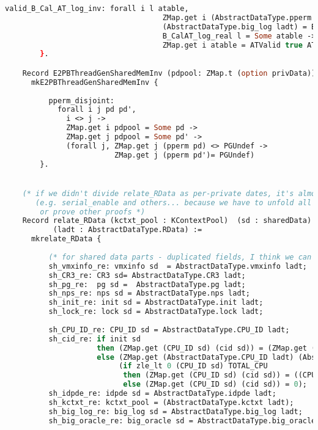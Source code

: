 \begin{lstlisting}[language=Caml]
          valid_B_Cal_AT_log_inv: forall i l atable, 
                                    ZMap.get i (AbstractDataType.pperm ladt) <> PGUndef ->
                                    (AbstractDataType.big_log ladt) = BigDef l ->
                                    B_CalAT_log_real l = Some atable ->
                                    ZMap.get i atable = ATValid true ATNorm
        }.

    Record E2PBThreadGenSharedMemInv (pdpool: ZMap.t (option privData)) :=
      mkE2PBThreadGenSharedMemInv {
          
          pperm_disjoint: 
            forall i j pd pd',
              i <> j ->
              ZMap.get i pdpool = Some pd ->
              ZMap.get j pdpool = Some pd' ->
              (forall j, ZMap.get j (pperm pd) <> PGUndef ->
                         ZMap.get j (pperm pd')= PGUndef)
        }.


    (* if we didn't divide relate_RData as per-private dates, it's almost impossible to prove some cases
       (e.g. serial_enable and others... because we have to unfold all iterations in the spec (100 iterations)
        or prove other proofs *)
    Record relate_RData (kctxt_pool : KContextPool)  (sd : sharedData)  (pdpool: ZMap.t (option privData))
           (ladt : AbstractDataType.RData) :=
      mkrelate_RData {
          
          (* for shared data parts - duplicated fields, I think we can remove them later *)
          sh_vmxinfo_re: vmxinfo sd  = AbstractDataType.vmxinfo ladt;
          sh_CR3_re: CR3 sd= AbstractDataType.CR3 ladt;
          sh_pg_re:  pg sd =  AbstractDataType.pg ladt;
          sh_nps_re: nps sd = AbstractDataType.nps ladt;
          sh_init_re: init sd = AbstractDataType.init ladt;
          sh_lock_re: lock sd = AbstractDataType.lock ladt;
          
          sh_CPU_ID_re: CPU_ID sd = AbstractDataType.CPU_ID ladt;
          sh_cid_re: if init sd
                     then (ZMap.get (CPU_ID sd) (cid sd)) = (ZMap.get (AbstractDataType.CPU_ID ladt) (AbstractDataType.cid ladt))
                     else (ZMap.get (AbstractDataType.CPU_ID ladt) (AbstractDataType.cid ladt)) = 0 /\
                          (if zle_lt 0 (CPU_ID sd) TOTAL_CPU
                           then (ZMap.get (CPU_ID sd) (cid sd)) = ((CPU_ID sd) + 1)
                           else (ZMap.get (CPU_ID sd) (cid sd)) = 0);
          sh_idpde_re: idpde sd = AbstractDataType.idpde ladt;
          sh_kctxt_re: kctxt_pool = (AbstractDataType.kctxt ladt);
          sh_big_log_re: big_log sd = AbstractDataType.big_log ladt;
          sh_big_oracle_re: big_oracle sd = AbstractDataType.big_oracle ladt;
          

\end{lstlisting}
